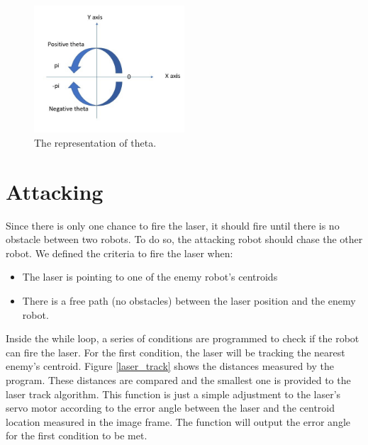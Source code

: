 \begin{figure}[thb]
    \centering
    \includegraphics[width=0.5\textwidth]{images/implementofhiding4.png}
    \caption[The representation of theta]{The representation of theta.}\label{hiding_implement4}
\end{figure}



\section{Attacking}
Since there is only one chance to fire the laser, it should fire until there is no obstacle between two robots. To do so, the attacking robot should chase the other robot. We defined the criteria to fire the laser when:
\begin{itemize}

  \item The laser is pointing to one of the enemy robot’s centroids
  \item There is a free path (no obstacles) between the laser position and the enemy robot.
\end{itemize}
Inside the while loop, a series of conditions are programmed to check if the robot can fire the laser. For the first condition, the laser will be tracking the nearest enemy’s centroid. Figure \ref{laser_track} shows the distances measured by the program. These distances are compared and the smallest one is provided to the laser track algorithm. This function is just a simple adjustment to the laser's servo motor according to the error angle between the laser and the centroid location measured in the image frame. The function will output the error angle for the first condition to be met.

